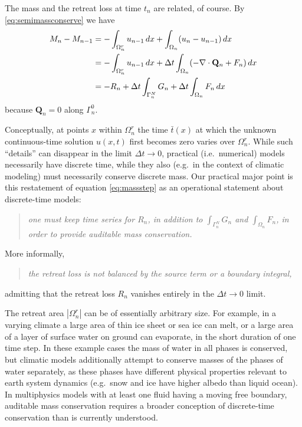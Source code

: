 \documentclass[final,leqno,onefignum,onetabnum]{siamltex1213bueler}
\newcommand\bQ{\mathbf{Q}}
\newcommand{\Div}{\nabla\cdot}
\begin{document}
The mass and the retreat loss at time $t_n$ are related, of course.  By \eqref{eq:semimassconserve} we have
\begin{align}
M_n - M_{n-1} &=  - \int_{\Omega_n^r} u_{n-1}\,dx + \int_{\Omega_n} (u_n - u_{n-1})\,dx \label{eq:massstep} \\
   &= - \int_{\Omega_n^r} u_{n-1}\,dx + \Delta t \int_{\Omega_n} (- \Div \bQ_n + F_n) \,dx \notag \\
   &= - R_n + \Delta t \int_{\Gamma_n^N} G_n + \Delta t \int_{\Omega_n} F_n\,dx \notag
\end{align}
because $\bQ_n=0$ along $\Gamma_n^0$.

Conceptually, at points $x$ within $\Omega_n^r$ the time $\bar t(x)$ at which the unknown continuous-time solution $u(x,t)$ first becomes zero varies over $\Omega_n^r$.  While such ``details'' can disappear in the limit $\Delta t \to 0$, practical (i.e.~numerical) models necessarily have discrete time, while they also (e.g.~in the context of climatic modeling) must necessarily conserve discrete mass.  Our practical major point is this restatement of equation \eqref{eq:massstep} as an operational statement about discrete-time models:
\begin{quote}
\emph{one must keep time series for $R_n$, in addition to $\int_{\Gamma_n^N} G_n$ and $\int_{\Omega_n} F_n$, in order to provide auditable mass conservation.}
\end{quote}
More informally,
\begin{quote}
\emph{the retreat loss is not balanced by the source term or a boundary integral,}
\end{quote}
admitting that the retreat loss $R_n$ vanishes entirely in the $\Delta t\to 0$ limit.

The retreat area $|\Omega_n^r|$ can be of essentially arbitrary size.  For example, in a varying climate a large area of thin ice sheet or sea ice can melt, or a large area of a layer of surface water on ground can evaporate, in the short duration of one time step.  In these example cases the mass of water in all phases is conserved, but climatic models additionally attempt to conserve masses of the phases of water separately, as these phases have different physical properties relevant to earth system dynamics (e.g.~snow and ice have higher albedo than liquid ocean).  In multiphysics models with at least one fluid having a moving free boundary, auditable mass conservation requires a broader conception of discrete-time conservation than is currently understood.
\end{document}
